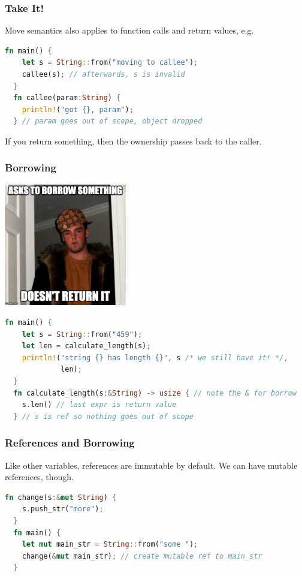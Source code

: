 \begin{frame}[fragile]
\frametitle{Take It!}


Move semantics also applies to function calls and return values, e.g.
\begin{lstlisting}[language=Rust]
  fn main() {
    let s = String::from("moving to callee");
    callee(s); // afterwards, s is invalid
  }
  fn callee(param:String) {
    println!("got {}, param");
  } // param goes out of scope, object dropped
\end{lstlisting}

If you return something, then the ownership passes back to the caller.


\end{frame}



\begin{frame}[fragile]
\frametitle{Borrowing}

\begin{center}
	\includegraphics[width=0.4\textwidth]{images/steve.jpeg}
\end{center}


\begin{lstlisting}[language=Rust]
  fn main() {
    let s = String::from("459");
    let len = calculate_length(s);
    println!("string {} has length {}", s /* we still have it! */,
             len);
  }
  fn calculate_length(s:&String) -> usize { // note the & for borrow
    s.len() // last expr is return value
  } // s is ref so nothing goes out of scope
\end{lstlisting}


\end{frame}

\begin{frame}[fragile]
\frametitle{References and Borrowing}

 Like other variables, references are immutable by default.
We can have mutable references, though.
\begin{lstlisting}[language=Rust]
  fn change(s:&mut String) {
    s.push_str("more");
  }
  fn main() {
    let mut main_str = String::from("some ");
    change(&mut main_str); // create mutable ref to main_str
  }
\end{lstlisting}


\end{frame}

